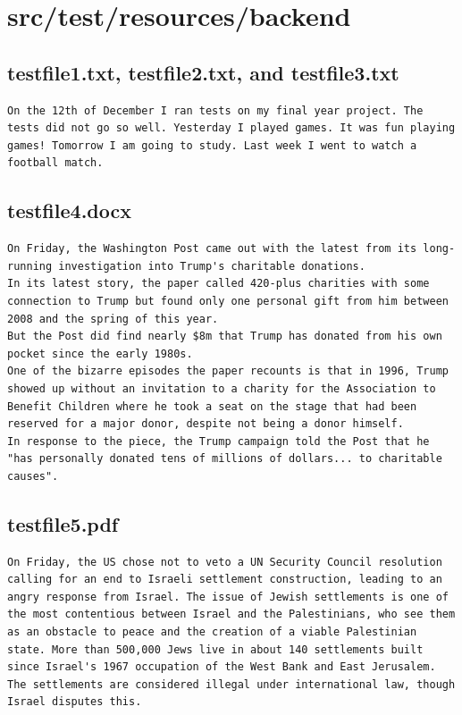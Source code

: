 \section{src/test/resources/backend}
\subsection{testfile1.txt, testfile2.txt, and testfile3.txt}
\begin{lstlisting}[numberstyle=\tiny\color{black},  keywordstyle=\color{black},  commentstyle=\color{black},  stringstyle=\color{black}, caption={Text in the files testfile1.txt, testfile2.txt and testfile3.txt}, captionpos=t]
On the 12th of December I ran tests on my final year project. The tests did not go so well. Yesterday I played games. It was fun playing games! Tomorrow I am going to study. Last week I went to watch a football match.
\end{lstlisting}
\subsection{testfile4.docx}
\begin{lstlisting}[numberstyle=\tiny\color{black},  keywordstyle=\color{black},  commentstyle=\color{black},  stringstyle=\color{black}, rulecolor=\color{black}, caption={Text in the file testfile4.docx}, captionpos=t]
On Friday, the Washington Post came out with the latest from its long-running investigation into Trump's charitable donations. 
In its latest story, the paper called 420-plus charities with some connection to Trump but found only one personal gift from him between 2008 and the spring of this year. 
But the Post did find nearly $8m that Trump has donated from his own pocket since the early 1980s.
One of the bizarre episodes the paper recounts is that in 1996, Trump showed up without an invitation to a charity for the Association to Benefit Children where he took a seat on the stage that had been reserved for a major donor, despite not being a donor himself. 
In response to the piece, the Trump campaign told the Post that he "has personally donated tens of millions of dollars... to charitable causes".
\end{lstlisting}
\subsection{testfile5.pdf}
\begin{lstlisting}[numberstyle=\tiny\color{black},  keywordstyle=\color{black},  commentstyle=\color{black},  stringstyle=\color{black}, caption={Text in the file testfile5.pdf}, captionpos=t]
On Friday, the US chose not to veto a UN Security Council resolution calling for an end to Israeli settlement construction, leading to an angry response from Israel. The issue of Jewish settlements is one of the most contentious between Israel and the Palestinians, who see them as an obstacle to peace and the creation of a viable Palestinian state. More than 500,000 Jews live in about 140 settlements built since Israel's 1967 occupation of the West Bank and East Jerusalem. The settlements are considered illegal under international law, though Israel disputes this.
\end{lstlisting}

